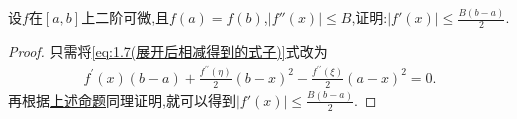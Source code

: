 \documentclass[lang=cn,newtx,10pt,scheme=chinese]{elegantbook}
\begin{document}
\begin{corollary}\label{pro:一阶导数可被二阶导数和原函数控制(端点函数值相同的情形)}
    设\(f\)在\([a,b]\)上二阶可微,且\(f(a)=f(b)\),\(\vert f''(x)\vert\leqslant B\),证明:\(\vert f'(x)\vert\leqslant\frac{B\left( b-a \right)}{2}\).
\end{corollary}
\begin{proof}
    只需将\eqref{eq:1.7(展开后相减得到的式子)}式改为
    \begin{align*}
        f^{\prime}(x)(b-a)+\frac{f^{\prime\prime}(\eta )}{2}(b-x)^2-\frac{f^{\prime\prime}(\xi )}{2}(a-x)^2=0.
    \end{align*}
    再根据\hyperref[pro:一阶导数可被二阶导数和原函数控制]{上述命题}同理证明,就可以得到\(\vert f'(x)\vert\leqslant\frac{B\left( b-a \right)}{2}\).
\end{proof}
\end{document}
